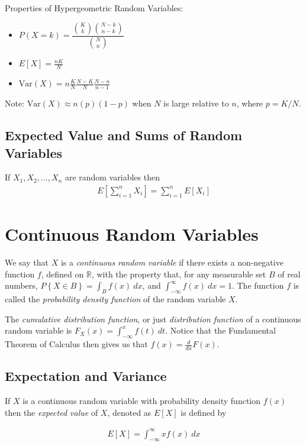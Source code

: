 \documentclass[10pt]{article}
\theoremstyle{definition}
\theoremstyle{theorem}
\begin{document}
			Properties of Hypergeometric Random Variables:
		\begin{multicols}{3}
			\begin{itemize}
				\item $P(X=k) = \dfrac{{K \choose k} {{N-k} \choose {n-k}}}{{N \choose n}}$
				\item $E[X] = \frac{nK}{N}$
				\item $\text{Var}(X)= n \frac{K}{N} \frac{N-K}{N} \frac{N-n}{n-1}$
			\end{itemize}
		\end{multicols}
		Note: $\text{Var}(X) \approx n(p)(1-p)$ when $N$ is large relative to $n$, where $p=K/N$.
		
		\subsection*{Expected Value and Sums of Random Variables}
		If $X_1, X_2, \ldots, X_n$ are random variables then
		\begin{align*}
			E \left[ \sum_{i=1}^{n} X_i \right] = \sum_{i=1}^{n} E[X_i]
		\end{align*}
		
		\newpage
		
		\section{Continuous Random Variables}
		We say that $X$ is a \emph{continuous random variable} if there exists a non-negative function $f$, defined on $\mathbb{R}$, with the property that, for any measurable set $B$ of real numbers, $P\left\{ X \in B \right\} = \int_{B} f(x)\: dx$, and $\int_{-\infty}^{\infty}f(x)\:dx = 1$. The function $f$ is called the \emph{probability density function} of the random variable $X$.
		
		The \emph{cumulative distribution function}, or just \emph{distribution function} of a continuous random variable is $F_X(x) = \int_{-\infty}^{x}f(t)\: dt$. Notice that the Fundamental Theorem of Calculus then gives us that \(f(x)=\frac{d}{dx}F(x)\).
		
		\subsection*{Expectation and Variance}
		If $X$ is a continuous random variable with probability density function $f(x)$ then the \emph{expected value} of $X$, denoted as $E[X]$ is defined by
		
		\begin{align*}
			E[X] = \int_{-\infty}^{\infty} xf(x)\:dx
		\end{align*}
		
\end{document}
